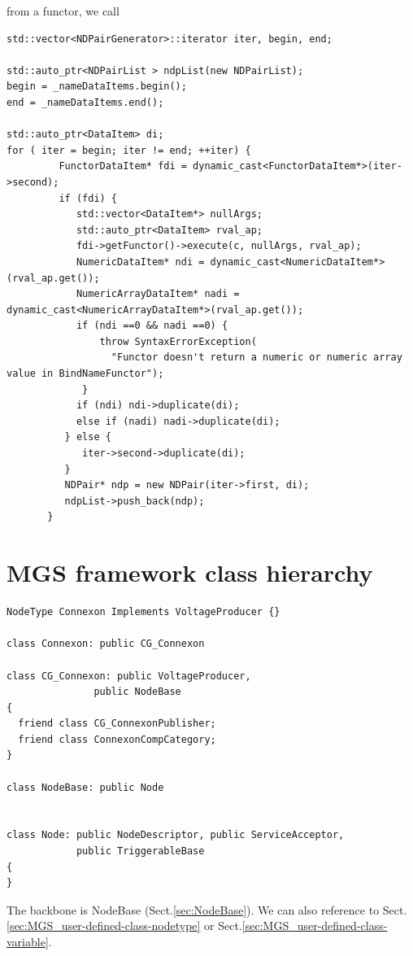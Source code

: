 from a functor, we call
\begin{lstlisting}
std::vector<NDPairGenerator>::iterator iter, begin, end;

std::auto_ptr<NDPairList > ndpList(new NDPairList);
begin = _nameDataItems.begin();
end = _nameDataItems.end();

std::auto_ptr<DataItem> di;
for ( iter = begin; iter != end; ++iter) {
         FunctorDataItem* fdi = dynamic_cast<FunctorDataItem*>(iter->second);
         if (fdi) {
            std::vector<DataItem*> nullArgs;
            std::auto_ptr<DataItem> rval_ap;
            fdi->getFunctor()->execute(c, nullArgs, rval_ap);
            NumericDataItem* ndi = dynamic_cast<NumericDataItem*>(rval_ap.get());
            NumericArrayDataItem* nadi = dynamic_cast<NumericArrayDataItem*>(rval_ap.get());
            if (ndi ==0 && nadi ==0) {
                throw SyntaxErrorException(
                  "Functor doesn't return a numeric or numeric array value in BindNameFunctor");
             }
            if (ndi) ndi->duplicate(di);
            else if (nadi) nadi->duplicate(di);
          } else {
             iter->second->duplicate(di);
          }
          NDPair* ndp = new NDPair(iter->first, di);
          ndpList->push_back(ndp);
       }

\end{lstlisting}


\section{MGS framework class hierarchy}
\label{sec:MGS-framework-class-hierarchy}

\begin{verbatim}
NodeType Connexon Implements VoltageProducer {}

class Connexon: public CG_Connexon

class CG_Connexon: public VoltageProducer, 
               public NodeBase
{
  friend class CG_ConnexonPublisher;
  friend class ConnexonCompCategory;
}

class NodeBase: public Node 


class Node: public NodeDescriptor, public ServiceAcceptor,
            public TriggerableBase
{
}
\end{verbatim}

The backbone is NodeBase (Sect.\ref{sec:NodeBase}).
We can also reference to Sect.\ref{sec:MGS_user-defined-class-nodetype} or
Sect.\ref{sec:MGS_user-defined-class-variable}.

